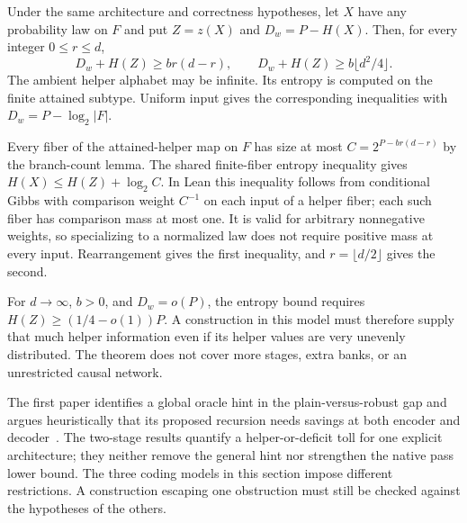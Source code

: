 \begin{theorem}\label{thm:local-helper-entropy}
Under the same architecture and correctness hypotheses, let $X$ have any
probability law on $F$ and put $Z=z(X)$ and $D_w=P-H(X)$.  Then, for every
integer $0\le r\le d$,
\begin{equation}\label{eq:local-helper-entropy}
  D_w+H(Z)\ge br(d-r),
  \qquad D_w+H(Z)\ge b\lfloor d^2/4\rfloor.
\end{equation}
The ambient helper alphabet may be infinite.  Its entropy is computed on the
finite attained subtype.  Uniform input gives the corresponding inequalities
with $D_w=P-\log_2|F|$.
\end{theorem}
\begin{proofoutline}
Every fiber of the attained-helper map on $F$ has size at most
$C=2^{P-br(d-r)}$ by the branch-count lemma.  The shared finite-fiber entropy
inequality gives $H(X)\le H(Z)+\log_2 C$.  In Lean this inequality follows
from conditional Gibbs with comparison weight $C^{-1}$ on each input of a
helper fiber; each such fiber has comparison mass at most one.  It is valid
for arbitrary nonnegative weights, so specializing to a normalized law does
not require positive mass at every input.  Rearrangement gives the first
inequality, and $r=\lfloor d/2\rfloor$ gives the second.
\end{proofoutline}

For $d\to\infty$, $b>0$, and $D_w=o(P)$, the entropy bound requires
$H(Z)\ge(1/4-o(1))P$.  A construction in this model must therefore supply
that much helper information even if its helper values are very unevenly
distributed.  The theorem does not cover more stages, extra banks, or an
unrestricted causal network.

The first paper identifies a global oracle hint in the plain-versus-robust
gap and argues heuristically that its proposed recursion needs savings at
both encoder and decoder~\cite[sections ``Plain versus robust'' and ``The construction
side'']{FirstPaper2026}.  The two-stage results quantify a helper-or-deficit
toll for one explicit architecture; they neither remove the general hint nor
strengthen the native pass lower bound.  The three coding models in this
section impose different restrictions.  A construction escaping one
obstruction must still be checked against the hypotheses of the others.
